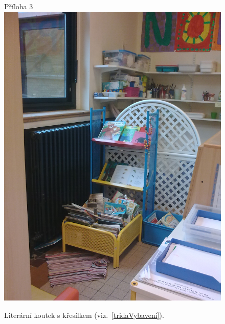 	\begin{figure}[tb]
		\centering
		Příloha 3\\
		\includegraphics[height = 0.35\textheight]{./fotky/Obr3.jpg}
		\caption{
			Literární koutek s křesílkem (viz.~\ref{tridaVybaveni}).
		}
		\label{Obr3}
	\end{figure}

